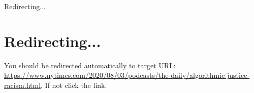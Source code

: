 Redirecting...

\hypertarget{redirecting}{%
\section{Redirecting...}\label{redirecting}}

You should be redirected automatically to target URL:
\url{https://www.nytimes.com/2020/08/03/podcasts/the-daily/algorithmic-justice-racism.html}.
If not click the link.
